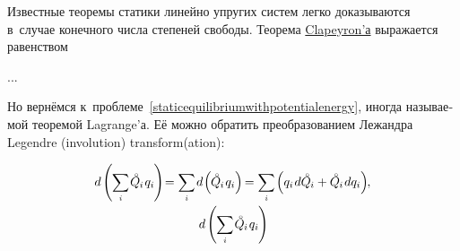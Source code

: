 \begin{otherlanguage}{russian}
Известные теоремы статики линейно упругих систем легко доказываются в~случае конечного числа степеней свободы. Теорема \href{https://en.wikipedia.org/wiki/Beno%C3%AEt_Paul_%C3%89mile_Clapeyron}{Clapeyron’а} выражается равенством

...

Но вернёмся к~проблеме~\eqref{staticequilibriumwithpotentialenergy}, иногда называемой теоремой Lagrange’а. Её можно обратить преобразованием Лежандра Legendre (involution) transform(ation):

\nopagebreak\vspace{-0.2em}\begin{equation*}
\begin{array}{c}\small
d \hspace{-0.1ex} \left( \hspace{-0.1ex} \scalebox{0.95}[1]{$\displaystyle \sum_{\smash{i}}$} \hspace{.2ex} \mathcircabove{Q}_{\hspace{-0.1ex}i} \hspace{.2ex} q_i \hspace{-0.12ex} \right) \hspace{-0.5ex}
= \scalebox{0.95}[1]{$\displaystyle \sum_{\smash{i}}$} \hspace{.25ex} d \hspace{-0.25ex} \left( \hspace{-0.1ex} \mathcircabove{Q}_{\hspace{-0.1ex}i} \hspace{.2ex} q_i \right) \hspace{-0.3ex}
= \scalebox{0.95}[1]{$\displaystyle \sum_{\smash{i}}$} \hspace{-0.16ex} \left(
q_i \hspace{.2ex} d \mathcircabove{Q}_{\hspace{-0.1ex}i}
+ \mathcircabove{Q}_{\hspace{-0.1ex}i} \hspace{.2ex} dq_i \right)
\hspace{-0.64ex} ,
\\[1.25em]
%
\small
d \hspace{-0.1ex} \left( \hspace{-0.1ex} \scalebox{0.95}[1]{$\displaystyle \sum_{\smash{i}}$} \hspace{.2ex} \mathcircabove{Q}_{\hspace{-0.1ex}i} \hspace{.2ex} q_i \hspace{-0.12ex} \right) \hspace{-0.4ex}

\end{array}
\end{equation*}
\end{otherlanguage}
